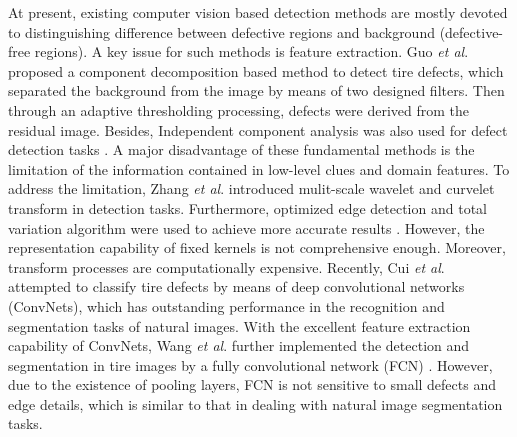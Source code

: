 \documentclass{article}
\begin{document}
At present, existing computer vision based detection methods are mostly devoted to distinguishing difference between defective regions and background (defective-free regions). A key issue for such methods is feature extraction. Guo {\it et al}. \cite{guo2012tire} proposed a component decomposition based method to detect tire defects, which separated the background from the image by means of two designed filters. Then through an adaptive thresholding processing, defects were derived from the residual image. Besides, Independent component analysis was also used for defect detection tasks \cite{cui2016defect,cui2016novel}. A major disadvantage of these fundamental methods is the limitation of the information contained in low-level clues and domain features. To address the limitation, Zhang {\it et al}. \cite{zhang2013defect,zhang2015automatic} introduced mulit-scale wavelet and curvelet transform in detection tasks. Furthermore, optimized edge detection and total variation algorithm were used to achieve more accurate results \cite{yan2013detection}. However, the representation capability of fixed kernels is not comprehensive enough. Moreover, transform processes are computationally expensive. Recently, Cui {\it et al}. \cite{cui2018tire} attempted to classify tire defects by means of deep convolutional networks (ConvNets), which has outstanding performance in the recognition and segmentation tasks of natural images. With the excellent feature extraction capability of ConvNets, Wang {\it et al}. \cite{wang2019tire} further implemented the detection and segmentation in tire images by a fully convolutional network (FCN) \cite{long2015fully}. However, due to the existence of pooling layers, FCN is not sensitive to small defects and edge details, which is similar to that in dealing with natural image segmentation tasks.
\end{document}
